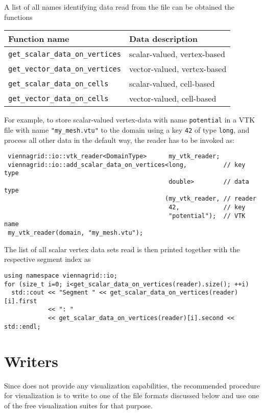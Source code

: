  A list of all names identifying data read from the file can be obtained the functions
 \begin{center}
  \begin{tabular}{|l|l|}
   \hline
   Function name & Data description \\
   \hline
   \lstinline|get_scalar_data_on_vertices| & scalar-valued, vertex-based \\
   \lstinline|get_vector_data_on_vertices| & vector-valued, vertex-based \\
   \hline
   \lstinline|get_scalar_data_on_cells| & scalar-valued, cell-based \\
   \lstinline|get_vector_data_on_cells| & vector-valued, cell-based \\
   \hline
  \end{tabular}
 \end{center}
  For example, to store scalar-valued vertex-data with name \texttt{potential} in a VTK file with name \lstinline|"my_mesh.vtu"| to the domain using a key \lstinline|42| of type \lstinline|long|, and process all other data in the default way, the reader has to be invoked as:
 \begin{lstlisting}
 viennagrid::io::vtk_reader<DomainType>      my_vtk_reader;
 viennagrid::io::add_scalar_data_on_vertices<long,          // key type
                                             double>        // data type
                                            (my_vtk_reader, // reader
                                             42,            // key
                                             "potential");  // VTK name
 my_vtk_reader(domain, "my_mesh.vtu");
 \end{lstlisting}
 The list of all scalar vertex data sets read is then printed together with the respective segment index as
 \begin{lstlisting}
using namespace viennagrid::io;
for (size_t i=0; i<get_scalar_data_on_vertices(reader).size(); ++i)
  std::cout << "Segment " << get_scalar_data_on_vertices(reader)[i].first 
            << ": "
            << get_scalar_data_on_vertices(reader)[i].second << std::endl;
 \end{lstlisting}
 

\section{Writers}
Since {\ViennaGrid} does not provide any visualization capabilities, the recommended procedure for visualization is 
to write to one of the file formats discussed below and use one of the free visualization suites for that purpose.

